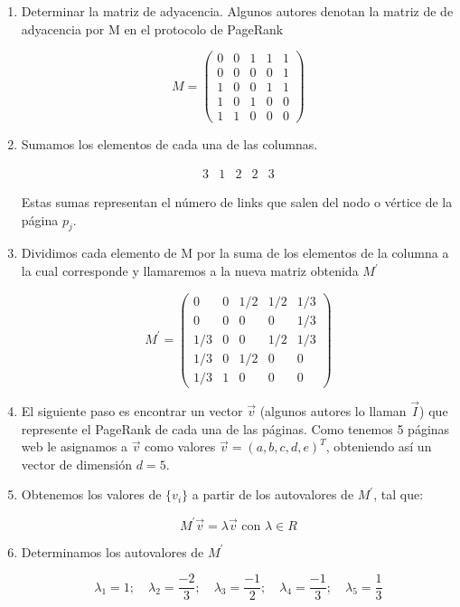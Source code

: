 \begin{enumerate}
\item Determinar la matriz de adyacencia. Algunos autores denotan la matriz de de adyacencia por M en el protocolo de PageRank

\[
M = \begin{pmatrix}
0 & 0 & 1 & 1 & 1 \\
0 & 0 & 0 & 0 & 1 \\
1 & 0 & 0 & 1 & 1 \\
1 & 0 & 1 & 0 & 0 \\
1 & 1 & 0 & 0 & 0
\end{pmatrix}
\]

\item Sumamos los elementos de cada una de las columnas.

\[
\begin{matrix}
3 & 1 & 2 & 2 & 3
\end{matrix}
\]

Estas sumas representan el número de links que salen del nodo o vértice de la página $p_j$.

\item Dividimos cada elemento de M por la suma de los elementos de la columna a la cual corresponde y llamaremos a la nueva matriz obtenida $M^\prime$

\[
M^\prime = \begin{pmatrix}
0 & 0 & 1/2 & 1/2 & 1/3 \\
0 & 0 & 0 & 0 & 1/3 \\
1/3 & 0 & 0 & 1/2 & 1/3 \\
1/3 & 0 & 1/2 & 0 & 0 \\
1/3 & 1 & 0 & 0 & 0
\end{pmatrix}
\]

\item El siguiente paso es encontrar un vector $\vec{v}$ (algunos autores lo llaman $\vec{I}$) que represente el PageRank de cada una de las páginas. Como tenemos 5 páginas web le asignamos a $\vec{v}$ como valores $\vec{v} = (a,b,c,d,e)^T$, obteniendo así un vector de dimensión $d=5$.

\item Obtenemos los valores de $\{v_i\}$ a partir de los autovalores de $M^\prime$, tal que:

\[
M^\prime \vec{v} = \lambda \vec{v} \text{ con }\lambda \in R
\]

\item Determinamos los autovalores de $M^\prime$

\[
\lambda_1 = 1; \quad \lambda_2 = \frac{-2}{3}; \quad \lambda_3 = \frac{-1}{2}; \quad \lambda_4 = \frac{-1}{3}; \quad \lambda_5 = \frac{1}{3}
\]


\end{enumerate}
